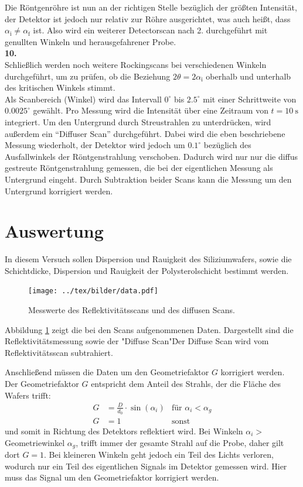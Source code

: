 Die Röntgenröhre ist nun an der richtigen Stelle bezüglich der größten Intensität, der Detektor ist jedoch nur relativ zur Röhre ausgerichtet, was auch heißt,
dass $\alpha_\text{i} \neq \alpha_\text{f}$ ist. Also wird ein weiterer Detectorscan nach 2. durchgeführt mit genullten Winkeln und herausgefahrener Probe.
\\ \textbf{10.}\\
Schließlich werden noch weitere Rockingscans bei verschiedenen Winkeln durchgeführt, um zu prüfen, ob die Beziehung $2\theta = 2\alpha_\text{i}$ oberhalb
und unterhalb des kritischen Winkels stimmt.%
\\
\noindent
Als Scanbereich (Winkel) wird das Intervall $0^\circ$ bis 
$2.5^\circ$ mit einer Schrittweite von $0.0025^\circ$ gewählt. Pro Messung wird die Intensität über eine Zeitraum von $t=\SI{10}{\second}$ integriert. 
Um den Untergrund durch Streustrahlen zu unterdrücken, wird außerdem ein ``Diffuser Scan'' durchgeführt. Dabei wird die eben beschriebene Messung wiederholt,
der Detektor wird jedoch um $0.1^\circ$ bezüglich des Ausfallwinkels der Röntgenstrahlung verschoben. Dadurch wird nur nur die diffus gestreute 
Röntgenstrahlung gemessen, die bei der eigentlichen Messung als Untergrund eingeht. Durch Subtraktion beider Scans kann die Messung um den Untergrund 
korrigiert werden.

\section{Auswertung}
In diesem Versuch sollen Dispersion und Rauigkeit des Siliziumwafers, sowie die Schichtdicke, Dispersion und Rauigkeit der Polysterolschicht bestimmt werden.

\begin{figure}[h]
 	\centering
 	\texttt{[image: ../tex/bilder/data.pdf]}
 	\caption{Messwerte des Reflektivitätsscans und des diffusen Scans.}
 	\label{pic:daten}
\end{figure}

Abbildung \ref{pic:daten} zeigt die bei den Scans aufgenommenen Daten. Dargestellt sind die Reflektivitätsmessung sowie der "Diffuse Scan"\. Der Diffuse Scan wird vom Reflektivitätsscan subtrahiert.

Anschließend müssen die Daten um den Geometriefaktor $G$ korrigiert werden.
Der Geometriefaktor $G$ entspricht dem Anteil des Strahls, der die Fläche des Wafers trifft:
\begin{align}
	G &= \frac{D}{d_0}\cdot \sin(\alpha_i) &\text{für $\alpha_i < \alpha_g$}\\
	G &= 1 &\text{sonst}
\end{align}
 und somit in Richtung des Detektors reflektiert wird. Bei Winkeln $\alpha_i >$ Geometriewinkel $\alpha_g$, trifft immer der gesamte Strahl auf die Probe, daher gilt dort $G=1$. Bei kleineren Winkeln geht jedoch ein Teil des Lichts verloren, wodurch nur ein Teil des eigentlichen Signals im Detektor gemessen wird. Hier muss das Signal um den Geometriefaktor korrigiert werden.

